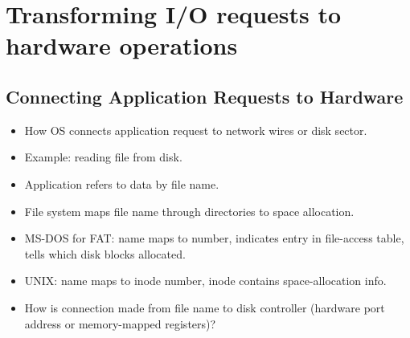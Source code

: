 \section{Transforming I/O requests to hardware operations}

\subsection{Connecting Application Requests to Hardware}
\begin{itemize}
    \item How OS connects application request to network wires or disk sector.
    \item Example: reading file from disk.
    \item Application refers to data by file name.
    \item File system maps file name through directories to space allocation.
    \item MS-DOS for FAT: name maps to number, indicates entry in file-access table, tells which disk blocks allocated.
    \item UNIX: name maps to inode number, inode contains space-allocation info.
    \item How is connection made from file name to disk controller (hardware port address or memory-mapped registers)?
\end{itemize}

